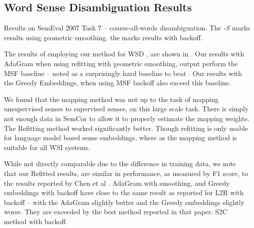 \documentclass{sig-alternate}
\begin{document}
\subsection{Word Sense Disambiguation Results} \label{WSDtask}
\begin{table}
	\begin{adjustbox}{max width=\columnwidth}
	\end{adjustbox}

	\caption{Results on SemEval 2007 Task 7 -- course-all-words disambiguation.
	The \emph{-S} marks results using geometric smoothing.
	the \emph{\textasteriskcentered } marks results with backoff.
	} \label{samevalres}
\end{table}

The results of employing our method for WSD , are shown in . Our results with AdaGram when using refitting with geometric smoothing, output perform the MSF baseline -- noted as a surprisingly hard baseline to beat \parencite{Chen2014}. Our results with the Greedy Embeddings, when using MSF backoff also exceed this baseline.

We found that the mapping method\parencite{agirre2006}  was not up to the task of mapping unsupervised senses to supervised senses, on this large scale task. There is simply not enough data in SemCor to allow it to properly estimate the mapping weights. The Refitting method worked significantly better. Though refitting is only usable for language model based sense embeddings, where as the mapping method is suitable for all WSI systems.

While not directly comparable due to the difference in training data, we note that our Refitted results, are similar in performance, as measured by F1 score, to the results reported by Chen et al \parencite{Chen2014}.
AdaGram with smoothing, and Greedy embeddings with backoff have close to the same result as reported for L2R with backoff -- with the AdaGram slightly better and the Greedy embeddings slightly worse. They are exceeded by the best method reported in that paper: S2C method with backoff.
\end{document}
